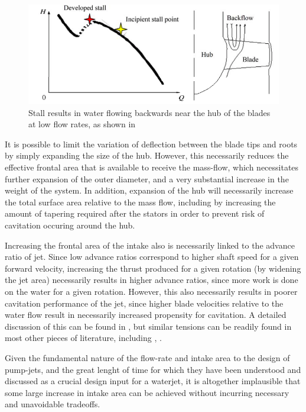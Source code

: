 \documentclass{article}\usepackage[]{graphicx}\usepackage[]{color}
\begin{document}
\begin{figure}
\includegraphics[width=\textwidth]{backflow.png}
\caption{Stall results in water flowing backwards near the hub of the blades at low flow rates, as shown in \cite{li2014rotating}}
\label{fig:backflow.png}
\end{figure}

It is possible to limit the variation of deflection between the blade tips and roots by simply expanding the size of the hub.  However, this necessarily reduces the effective frontal area that is available to receive the mass-flow, which necessitates further expansion of the outer diameter, and a very substantial increase in the weight of the system.  In addition, expansion of the hub will necessarily increase the total surface area relative to the mass flow, including by increasing the amount of tapering required after the stators in order to prevent risk of cavitation occuring around the hub.

Increasing the frontal area of the intake also is necessarily linked to the advance ratio of jet.  Since low advance ratios correspond to higher shaft speed for a given forward velocity, increasing the thrust produced for a given rotation (by widening the jet area) necessarily results in higher advance ratios, since more work is done on the water for a given rotation. However, this also necessarily results in poorer cavitation performance of the jet, since higher blade velocities relative to the water flow result in necessarily increased propensity for cavitation.  A detailed discussion of this can be found in \cite{gearhart1966selection}, but similar tensions can be readily found in most other pieces of literature, including \cite{henderson1964}, \cite{wislicenus1973}.

Given the fundamental nature of the flow-rate and intake area to the design of pump-jets, and the great lenght of time for which they have been understood and discussed as a crucial design input for a waterjet, it is altogether implausible that some large increase in intake area can be achieved without incurring necessary and unavoidable tradeoffs.
\end{document}
